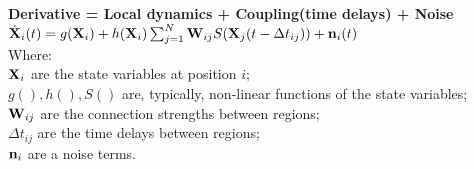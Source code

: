 \documentclass[12pt]{article}
\begin{document}
  
    {\bf Derivative = Local dynamics + Coupling(time delays) + Noise}\\
  
    $\dot{\bf X}_i(t) = g({\bf X}_i) + h({\bf X}_i)\sum_{j=1}^{N}{\bf W}_{ij} S({\bf X}_j(t-\Delta t_{ij})) + {\bf n}_i(t)$ \\
    
    Where: \\
    ${\bf X}_i$  are the state variables at position $i$; \\
    $g(), h(), S()$ are, typically, non-linear functions of the state variables; \\
    ${\bf W}_{ij}$ are the connection strengths between regions;\\
    $\Delta t_{ij}$ are the time delays between regions;\\
    ${\bf n}_i$ are a noise terms.
    
    
    
    
  
\end{document}
